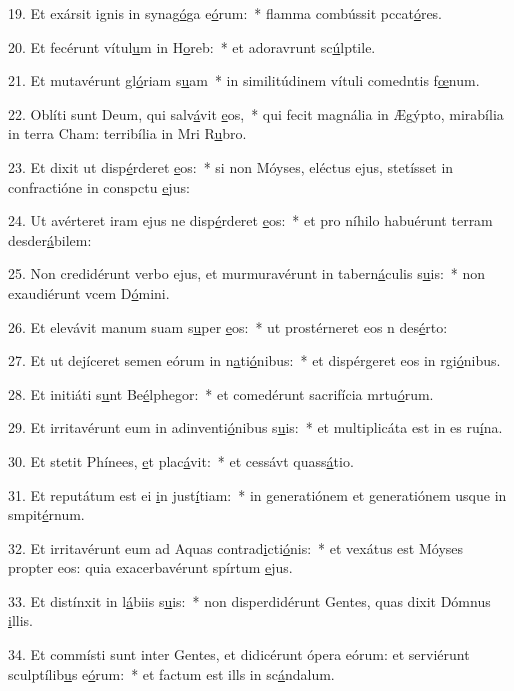 19. Et exársit ignis in synag\uline{ó}ga e\uline{ó}rum:~* flamma combússit pccat\uline{ó}res.\par 
20. Et fecérunt vítul\uline{u}m in H\uline{o}reb:~* et adoravrunt sc\uline{ú}lptile.\par 
21. Et mutavérunt gl\uline{ó}riam s\uline{u}am~* in similitúdinem vítuli comedntis f\uline{œ}num.\par 
22. Oblíti sunt Deum, qui salv\uline{á}vit \uline{e}os,~* qui fecit magnália in Ægýpto, mirabília in terra Cham: terribília in Mri R\uline{u}bro.\par 
23. Et dixit ut disp\uline{é}rderet \uline{e}os:~* si non Móyses, eléctus ejus, stetísset in confractióne in conspctu \uline{e}jus:\par 
24. Ut avérteret iram ejus ne disp\uline{é}rderet \uline{e}os:~* et pro níhilo habuérunt terram desder\uline{á}bilem:\par 
25. Non credidérunt verbo ejus, et murmuravérunt in tabern\uline{á}culis s\uline{u}is:~* non exaudiérunt vcem D\uline{ó}mini.\par 
26. Et elevávit manum suam s\uline{u}per \uline{e}os:~* ut prostérneret eos n des\uline{é}rto:\par 
27. Et ut dejíceret semen eórum in n\uline{a}ti\uline{ó}nibus:~* et dispérgeret eos in rgi\uline{ó}nibus.\par 
28. Et initiáti s\uline{u}nt Be\uline{é}lphegor:~* et comedérunt sacrifícia mrtu\uline{ó}rum.\par 
29. Et irritavérunt eum in adinventi\uline{ó}nibus s\uline{u}is:~* et multiplicáta est in es ru\uline{í}na.\par 
30. Et stetit Phínees, \uline{e}t plac\uline{á}vit:~* et cessávt quass\uline{á}tio.\par 
31. Et reputátum est ei \uline{i}n just\uline{í}tiam:~* in generatiónem et generatiónem usque in smpit\uline{é}rnum.\par 
32. Et irritavérunt eum ad Aquas contrad\uline{i}cti\uline{ó}nis:~* et vexátus est Móyses propter eos: quia exacerbavérunt spírtum \uline{e}jus.\par 
33. Et distínxit in l\uline{á}biis s\uline{u}is:~* non disperdidérunt Gentes, quas dixit Dómnus \uline{i}llis.\par 
34. Et commísti sunt inter Gentes, et didicérunt ópera eórum: et serviérunt sculptílib\uline{u}s e\uline{ó}rum:~* et factum est ills in sc\uline{á}ndalum.\par 
